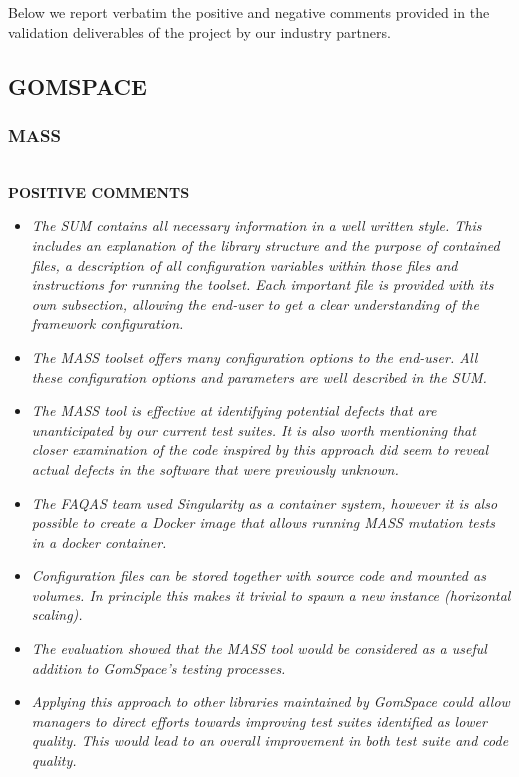 Below we report verbatim the positive and negative comments provided in the validation deliverables of the project by our industry partners. 

\subsection{GOMSPACE}

\subsubsection{MASS}\ \\ 

\textbf{POSITIVE COMMENTS}

\begin{itemize}
\item \emph{The SUM contains all necessary information in a well written style. This includes an explanation of the library structure and the purpose of contained files, a description of all configuration variables within those files and instructions for running the toolset. Each important file is provided with its own subsection, allowing the end-user to get a clear understanding of the framework configuration.} 

 

\item \emph{The MASS toolset offers many configuration options to the end-user. All these configuration options and parameters are well described in the SUM. }

\item \emph{The MASS tool is effective at identifying potential defects that are unanticipated by our current test suites. It is also worth mentioning that closer examination of the code inspired by this approach did seem to reveal actual defects in the software that were previously unknown.} 


\item \emph{The FAQAS team used Singularity as a container system, however it is also possible to create a Docker image that allows running MASS mutation tests in a docker container.} 

\item \emph{Configuration files can be stored together with source code and mounted as volumes. In principle this makes it trivial to spawn a new instance (horizontal scaling).} 

\item \emph{The evaluation showed that the MASS tool would be considered as a useful addition to GomSpace’s testing processes.} 

\item \emph{Applying this approach to other libraries maintained by GomSpace could allow managers to direct efforts towards improving test suites identified as lower quality. This would lead to an overall improvement in both test suite and code quality.}

\end{itemize}


